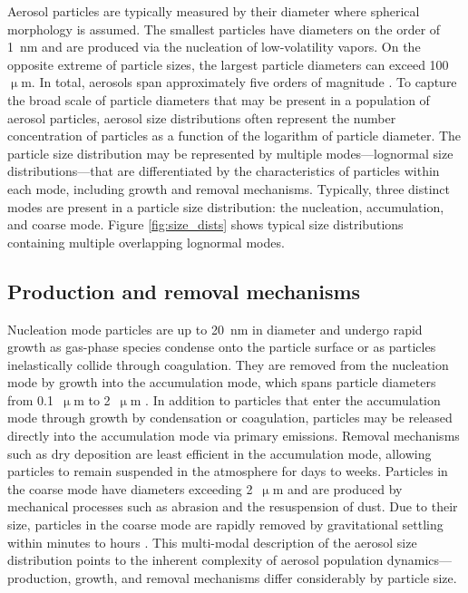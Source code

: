 Aerosol particles are typically measured by their diameter where spherical morphology is assumed. The smallest particles have diameters on the order of 1~nm and are produced via the nucleation of low-volatility vapors. On the opposite extreme of particle sizes, the largest particle diameters can exceed 100~$\upmu$m. In total, aerosols span approximately five orders of magnitude \parencite{seinfeld_atmospheric_1998}. To capture the broad scale of particle diameters that may be present in a population of aerosol particles, aerosol size distributions often represent the number concentration of particles as a function of the logarithm of particle diameter. The particle size distribution may be represented by multiple modes---lognormal size distributions---that are differentiated by the characteristics of particles within each mode, including growth and removal mechanisms. Typically, three distinct modes are present in a particle size distribution: the nucleation, accumulation, and coarse mode. Figure \ref{fig:size_dists} shows typical size distributions containing multiple overlapping lognormal modes. 

\subsection{Production and removal mechanisms}
Nucleation mode particles are up to 20~nm in diameter and undergo rapid growth as gas-phase species condense onto the particle surface or as particles inelastically collide through coagulation. They are removed from the nucleation mode by growth into the accumulation mode, which spans particle diameters from 0.1~$\upmu$m to 2~$\upmu$m . In addition to particles that enter the accumulation mode through growth by condensation or coagulation, particles may be released directly into the accumulation mode via primary emissions. Removal mechanisms such as dry deposition are least efficient in the accumulation mode, allowing particles to remain suspended in the atmosphere for days to weeks. Particles in the coarse mode have diameters exceeding 2~$\upmu$m  and are produced by mechanical processes such as abrasion and the resuspension of dust. Due to their size, particles in the coarse mode are rapidly removed by gravitational settling within minutes to hours \parencite{seinfeld_atmospheric_1998}. This multi-modal description of the aerosol size distribution points to the inherent complexity of aerosol population dynamics---production, growth, and removal mechanisms differ considerably by particle size. 

